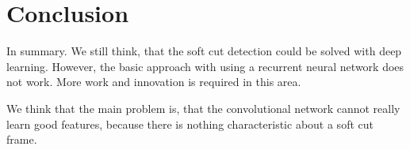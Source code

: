 \section{Conclusion}
\label{sec:conclusion}

In summary.
We still think, that the soft cut detection could be solved with deep learning.
However, the basic approach with using a recurrent neural network does not work.
More work and innovation is required in this area.

We think that the main problem is, that the convolutional network cannot really learn good features, because there is nothing characteristic about a soft cut frame.
